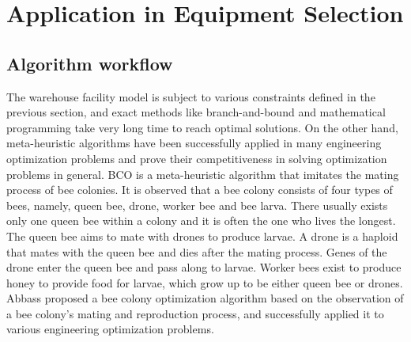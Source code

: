 \section{Application in Equipment Selection}
\subsection{Algorithm workflow}
The warehouse facility model is subject to various constraints defined in the previous section, and exact methods like branch-and-bound and mathematical programming take very long time to reach optimal solutions.
On the other hand, meta-heuristic algorithms have been successfully applied in many engineering optimization problems and prove their competitiveness in solving optimization problems in general.
BCO is a meta-heuristic algorithm that imitates the mating process of bee colonies.
It is observed that a bee colony consists of four types of bees, namely, queen bee, drone, worker bee and bee larva. 
There usually exists only one queen bee within a colony and it is often the one who lives the longest.
The queen bee aims to mate with drones to produce larvae.
A drone is a haploid that mates with the queen bee and dies after the mating process.
Genes of the drone enter the queen bee and pass along to larvae.
Worker bees exist to produce honey to provide food for larvae, which grow up to be either queen bee or drones.
Abbass proposed a bee colony optimization algorithm based on the observation of a bee colony's mating and reproduction process, and successfully applied it to various engineering optimization problems.


